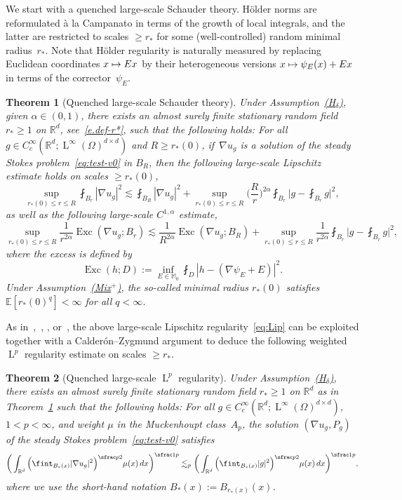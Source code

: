 \documentclass[JEP,XML,SOM,Unicode,published]{cedram}
\newcommand\mto{\mathchoice{\longmapsto}{\mapsto}{\mapsto}{\mapsto}}
\newcommand{\Hd}{\hyperref[Hd]{\textup{(H$_\delta$)}}\xspace}
\newcommand{\Mix}{\hyperref[Mix+]{\textup{(Mix$^+$)}}\xspace}
\theoremstyle{plain}
\newtheorem{theor1}{Theorem}
\theoremstyle{definition}
\newcommand{\Exc}{\operatorname{Exc}}
\newcommand{\R}{\mathbb R}
\newcommand{\Md}{\mathbb M}
\newcommand{\Ld}{\operatorname{L}}
\newcommand{\expec}[1]{\mathbb{E}\left[ #1 \right]}
\begin{document}
We start with a quenched large-scale Schauder theory.
Hölder norms are reformulated à la Campanato in terms of the growth of local integrals, and the latter are restricted to scales $\ge r_*$ for some (well-controlled) random minimal radius~$r_*$.
Note that Hölder regularity is naturally measured by replacing Euclidean coordinates $x\mto Ex$ by their heterogeneous versions $x\mto \psi_E(x)+Ex$ in terms of the corrector~$\psi_E$.

\begin{theor1}[Quenched large-scale Schauder theory]\label{th:schauder}
Under Assumption~\Hd, given \mbox{$\alpha\in(0,1)$}, there exists an almost surely finite stationary random field $r_*\ge1$ on $\R^d$, see~\eqref{e.def-r*}, such that the following holds: For all $g\in C^\infty_c(\R^d;\Ld^\infty(\Omega)^{d\times d})$ and $R\ge r_*(0)$, if~$\nabla u_g$ is a solution of the steady Stokes problem~\eqref{eq:test-v0} in $B_R$, then the following large-scale Lipschitz estimate holds on scales $\ge r_*(0)$,
\begin{equation}\label{eq:Lip}
\sup_{r_*(0)\le r\le R} \fint_{B_r} |\nabla u_g|^2 \lesssim \fint_{B_R} |\nabla u_g|^2+ \sup_{r_*(0)\le r\le R} \Big(\frac R r\Big)^{2\alpha}\fint_{B_r} \Big|g-\fint_{B_r}g\Big|^2,
\end{equation}
as well as the following large-scale $C^{1,\alpha}$ estimate,
\begin{equation*}\label{eq:C1a}
\sup_{r_*(0)\le r\le R}\frac1{r^{2\alpha}}\Exc(\nabla u_g;B_r) \lesssim \frac1{R^{2\alpha}} \Exc(\nabla u_g;B_R)+\sup_{r_*(0)\le r\le R} \frac1{r^{2\alpha}} \fint_{B_r} \Big|g-\fint_{B_r}g\Big|^2,
\end{equation*}
where the excess is defined by
\begin{equation}\label{eq:def-exc}
\Exc(h;D):=\inf_{E\in\Md_0}\fint_D|h-(\nabla\psi_E+E)|^2.
\end{equation}
Under Assumption~\Mix, the so-called minimal radius $r_*(0)$ satisfies \mbox{$\expec{r_*(0)^q}<\infty$} for all $q<\infty$.
\end{theor1}
As in~\cite{Armstrong-Daniel-16},~\cite[\S 7]{AKM-book}, \cite[Cor.\,4]{GNO-reg}, or~\cite[Prop.\,6.4]{DO1}, the above large-scale Lipschitz regularity~\eqref{eq:Lip} can be exploited together with a Calderón--Zygmund argument to deduce the following weighted $\Ld^p$ regularity estimate on scales $\ge r_*$.
\begin{theor1}[Quenched large-scale $\Ld^p$ regularity]\label{th:lp-reg}
Under Assumption~\Hd, there exists an almost surely finite stationary random field $r_*\ge1$ on $\R^d$ as in Theorem~\ref{th:schauder} such that the following holds: For all $g\in C^\infty_c(\R^d;\Ld^\infty(\Omega)^{d\times d})$, $1<p<\infty$, and weight $\mu$ in the Muckenhoupt class~$A_p$,
the solution $(\nabla u_g,P_g)$ of the steady Stokes problem~\eqref{eq:test-v0} satisfies
\[\bigg(\int_{\R^d}\Big(\fint_{B_*(x)}|\nabla u_g|^2\Big)^{\sfrac p2}\mu(x)\,dx\bigg)^{\sfrac1p}\lesssim_p \bigg(\int_{\R^d}\Big(\fint_{B_*(x)}|g|^2\Big)^{\sfrac p2}\mu(x)\,dx\bigg)^{\sfrac1p},\]
where we use the short-hand notation $B_*(x):=B_{r_*(x)}(x)$.
\end{theor1}
\end{document}
